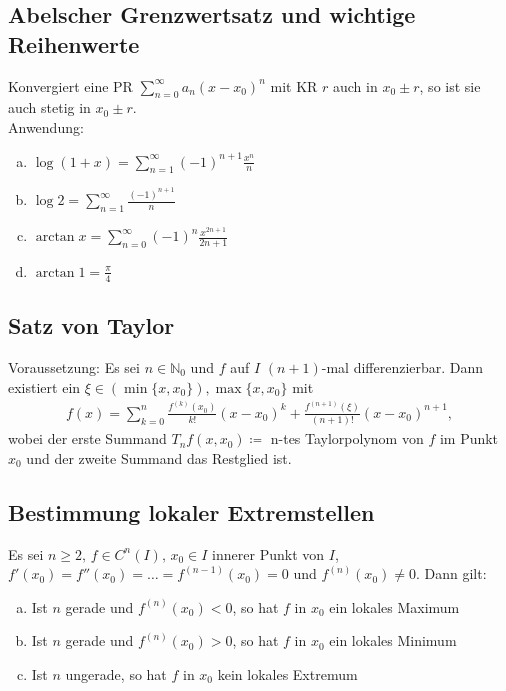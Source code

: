 \documentclass{article}
\begin{document}
\subsection{Abelscher Grenzwertsatz und wichtige Reihenwerte}
Konvergiert eine PR $\sum \limits_{n=0}^{\infty} a_n(x-x_0)^n$ mit KR $r$ auch in $x_0 \pm r$, so ist sie auch stetig in $x_0 \pm r$. \\
Anwendung:
\begin{enumerate} [a)]
    \item $\log(1+x) = \sum \limits_{n=1}^{\infty} (-1)^{n+1} \frac{x^n}{n}$
    \item $\log 2 = \sum \limits_{n=1}^{\infty} \frac{(-1)^{n+1}}{n}$
    \item $\arctan x = \sum \limits_{n=0}^{\infty} (-1)^n \frac{x^{2n+1}}{2n+1}$
    \item $\arctan 1 = \frac{\pi}{4}$
\end{enumerate}

\newpage

\subsection{Satz von Taylor}
Voraussetzung: Es sei $n \in \mathbb{N}_0$ und $f$ auf $I$ $(n+1)$-mal differenzierbar. Dann existiert ein $\xi \in (\min\{x,x_0\}),\max\{x,x_0\}$ mit 
\begin{align*}
    f(x) = \sum \limits_{k=0}^{n} \frac{f^{(k)}(x_0)}{k!} (x-x_0)^k + \frac{f^{(n+1)} (\xi)}{(n+1)!} (x-x_0)^{n+1},
\end{align*}
wobei der erste Summand $T_n f(x,x_0) \coloneqq$ n-tes Taylorpolynom von $f$ im Punkt $x_0$ und der zweite Summand das Restglied ist.

\subsection{Bestimmung lokaler Extremstellen}
Es sei $n \geq 2 \text{, } f \in C^n(I) \text{, } x_0 \in I$ innerer Punkt von $I$, $f'(x_0) = f''(x_0)=\ldots=f^{(n-1)}(x_0)=0$ und $f^{(n)}(x_0) \neq 0$.
Dann gilt:
\begin{enumerate} [a)]
    \item Ist $n$ gerade und $f^{(n)}(x_0)<0$, so hat $f$ in $x_0$ ein lokales Maximum
    \item Ist $n$ gerade und $f^{(n)}(x_0)>0$, so hat $f$ in $x_0$ ein lokales Minimum
    \item Ist $n$ ungerade, so hat $f$ in $x_0$ kein lokales Extremum
\end{enumerate}
\end{document}
